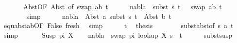 \begin{isabellebody}
\ \ \ \ \ \isamarkupfalse%
\ Abst{\isacharparenleft}{\kern0pt}{}{\isacharparenright}{\kern0pt}{\isacharbrackleft}{\kern0pt}OF\ Abst{\isacharparenleft}{\kern0pt}{}{\isacharparenright}{\kern0pt}{\isacharcomma}{\kern0pt}\ of\ {\isacartoucheopen}swap\ {\isacharbrackleft}{\kern0pt}{\isacharparenleft}{\kern0pt}a{\isacharcomma}{\kern0pt}b{\isacharparenright}{\kern0pt}{\isacharbrackright}{\kern0pt}\ t{}{\isacharprime}{\kern0pt}{\isacartoucheclose}{\isacharbrackright}{\kern0pt}\isanewline
\ \ \ \ \isamarkupfalse%
\ {\isachardoublequoteopen}nabla\ {\isasymturnstile}\ subst\ s{}\ t{}{\isacharprime}{\kern0pt}\ {\isasymapprox}\ \ swap\ {\isacharbrackleft}{\kern0pt}{\isacharparenleft}{\kern0pt}a{\isacharcomma}{\kern0pt}b{\isacharparenright}{\kern0pt}{\isacharbrackright}{\kern0pt}\ t{}{\isacharprime}{\kern0pt}{\isachardoublequoteclose}\ \isanewline
\ \ \ \ \ \ \isamarkupfalse%
\ simp\isanewline
\ \ \ \ \isamarkupfalse%
\ {\isachardoublequoteopen}nabla\ {\isasymturnstile}\ Abst\ a\ {\isacharparenleft}{\kern0pt}subst\ s{}\ t{}{\isacharprime}{\kern0pt}{\isacharparenright}{\kern0pt}\ {\isasymapprox}\ Abst\ b\ t{}{\isacharprime}{\kern0pt}{\isachardoublequoteclose}\isanewline
\ \ \ \ \ \ \isamarkupfalse%
\ equ{\isacharunderscore}{\kern0pt}abst{\isacharunderscore}{\kern0pt}ab{\isacharbrackleft}{\kern0pt}OF\ False\ fresh{\isacharbrackright}{\kern0pt}\ \isamarkupfalse%
\ simp\isanewline
\ \ \ \ \isamarkupfalse%
\ t{}\ \isamarkupfalse%
\ {\isacharquery}{\kern0pt}thesis\isanewline
\ \ \ \ \ \ \isamarkupfalse%
\ subst{\isacharunderscore}{\kern0pt}abst{\isacharbrackleft}{\kern0pt}of\ s{}\ a\ t{}{\isacharprime}{\kern0pt}{\isacharbrackright}{\kern0pt}\ \isamarkupfalse%
\ simp\isanewline
\ \ \isamarkupfalse%
\isanewline
{}\isamarkupfalse%
\isanewline
\ \ \isamarkupfalse%
\ {\isacharparenleft}{\kern0pt}Susp\ pi\ X{\isacharparenright}{\kern0pt}\isanewline
\ \ \isamarkupfalse%
\ {\isachardoublequoteopen}nabla\ {\isasymturnstile}\ swap\ pi\ {\isacharparenleft}{\kern0pt}look{\isacharunderscore}{\kern0pt}up\ X\ s{}{\isacharparenright}{\kern0pt}\ {\isasymapprox}\ t{}{\isachardoublequoteclose}\isanewline
\ \ \ \ \isamarkupfalse%
\ subst{\isacharunderscore}{\kern0pt}susp\ \isamarkupfalse%

\end{isabellebody}
